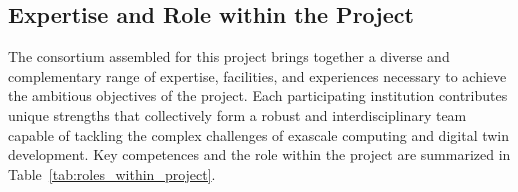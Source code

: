 \documentclass[a4paper,12pt]{article}
\begin{document}
\subsection{\textcolor{EUblue}{Expertise and Role within the Project}}

The consortium assembled for this project brings together a diverse and complementary range of expertise, facilities, and experiences necessary to achieve the ambitious objectives of the project. Each participating institution contributes unique strengths that collectively form a robust and interdisciplinary team capable of tackling the complex challenges of exascale computing and digital twin development. Key competences and the role within the project are summarized in Table~\ref{tab:roles_within_project}.

\end{document}
